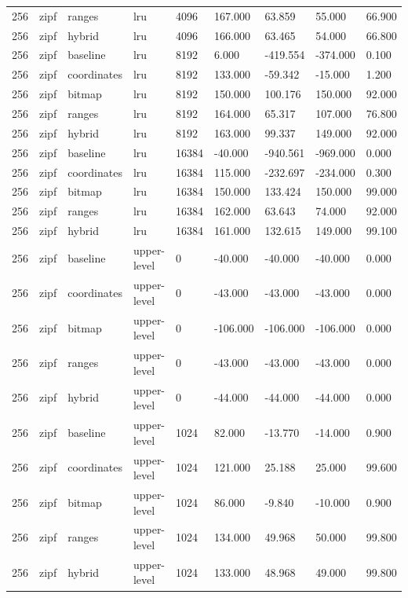 \begin{tabular}{lllllllll}
256 & zipf & ranges & lru & 4096 & 167.000 & 63.859 & 55.000 & 66.900 \\
256 & zipf & hybrid & lru & 4096 & 166.000 & 63.465 & 54.000 & 66.800 \\
256 & zipf & baseline & lru & 8192 & 6.000 & -419.554 & -374.000 & 0.100 \\
256 & zipf & coordinates & lru & 8192 & 133.000 & -59.342 & -15.000 & 1.200 \\
256 & zipf & bitmap & lru & 8192 & 150.000 & 100.176 & 150.000 & 92.000 \\
256 & zipf & ranges & lru & 8192 & 164.000 & 65.317 & 107.000 & 76.800 \\
256 & zipf & hybrid & lru & 8192 & 163.000 & 99.337 & 149.000 & 92.000 \\
256 & zipf & baseline & lru & 16384 & -40.000 & -940.561 & -969.000 & 0.000 \\
256 & zipf & coordinates & lru & 16384 & 115.000 & -232.697 & -234.000 & 0.300 \\
256 & zipf & bitmap & lru & 16384 & 150.000 & 133.424 & 150.000 & 99.000 \\
256 & zipf & ranges & lru & 16384 & 162.000 & 63.643 & 74.000 & 92.000 \\
256 & zipf & hybrid & lru & 16384 & 161.000 & 132.615 & 149.000 & 99.100 \\
256 & zipf & baseline & upper-level & 0 & -40.000 & -40.000 & -40.000 & 0.000 \\
256 & zipf & coordinates & upper-level & 0 & -43.000 & -43.000 & -43.000 & 0.000 \\
256 & zipf & bitmap & upper-level & 0 & -106.000 & -106.000 & -106.000 & 0.000 \\
256 & zipf & ranges & upper-level & 0 & -43.000 & -43.000 & -43.000 & 0.000 \\
256 & zipf & hybrid & upper-level & 0 & -44.000 & -44.000 & -44.000 & 0.000 \\
256 & zipf & baseline & upper-level & 1024 & 82.000 & -13.770 & -14.000 & 0.900 \\
256 & zipf & coordinates & upper-level & 1024 & 121.000 & 25.188 & 25.000 & 99.600 \\
256 & zipf & bitmap & upper-level & 1024 & 86.000 & -9.840 & -10.000 & 0.900 \\
256 & zipf & ranges & upper-level & 1024 & 134.000 & 49.968 & 50.000 & 99.800 \\
256 & zipf & hybrid & upper-level & 1024 & 133.000 & 48.968 & 49.000 & 99.800 \\

\end{tabular}
